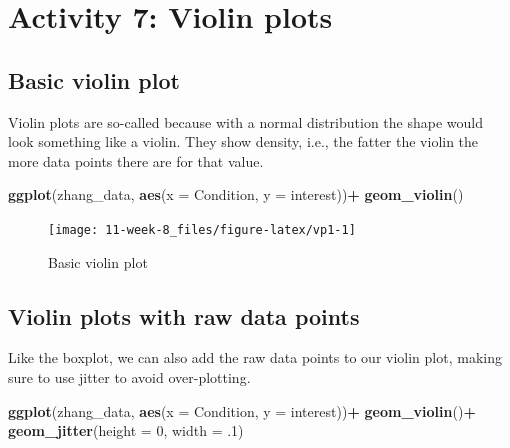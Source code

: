 \documentclass[]{book}
\newenvironment{Shaded}{\begin{snugshade}}{\end{snugshade}}
\newcommand{\DataTypeTok}[1]{\textcolor[rgb]{0.13,0.29,0.53}{#1}}
\newcommand{\DecValTok}[1]{\textcolor[rgb]{0.00,0.00,0.81}{#1}}
\newcommand{\FloatTok}[1]{\textcolor[rgb]{0.00,0.00,0.81}{#1}}
\newcommand{\KeywordTok}[1]{\textcolor[rgb]{0.13,0.29,0.53}{\textbf{#1}}}
\newcommand{\NormalTok}[1]{#1}
\newcommand{\OperatorTok}[1]{\textcolor[rgb]{0.81,0.36,0.00}{\textbf{#1}}}
\newcommand{\StringTok}[1]{\textcolor[rgb]{0.31,0.60,0.02}{#1}}
\begin{document}
\hypertarget{activity-7-violin-plots}{%
\section{Activity 7: Violin plots}\label{activity-7-violin-plots}}

\hypertarget{basic-violin-plot}{%
\subsection{Basic violin plot}\label{basic-violin-plot}}

Violin plots are so-called because with a normal distribution the shape would look something like a violin. They show density, i.e., the fatter the violin the more data points there are for that value.

\begin{Shaded}
\begin{Highlighting}[]
\KeywordTok{ggplot}\NormalTok{(zhang_data, }\KeywordTok{aes}\NormalTok{(}\DataTypeTok{x =}\NormalTok{ Condition, }\DataTypeTok{y =}\NormalTok{ interest))}\OperatorTok{+}
\StringTok{  }\KeywordTok{geom_violin}\NormalTok{()}
\end{Highlighting}
\end{Shaded}

\begin{figure}

{\centering \texttt{[image: 11-week-8\_files/figure-latex/vp1-1]} 

}

\caption{Basic violin plot}\label{fig:vp1}
\end{figure}

\hypertarget{violin-plots-with-raw-data-points}{%
\subsection{Violin plots with raw data points}\label{violin-plots-with-raw-data-points}}

Like the boxplot, we can also add the raw data points to our violin plot, making sure to use jitter to avoid over-plotting.

\begin{Shaded}
\begin{Highlighting}[]
\KeywordTok{ggplot}\NormalTok{(zhang_data, }\KeywordTok{aes}\NormalTok{(}\DataTypeTok{x =}\NormalTok{ Condition, }\DataTypeTok{y =}\NormalTok{ interest))}\OperatorTok{+}
\StringTok{  }\KeywordTok{geom_violin}\NormalTok{()}\OperatorTok{+}
\StringTok{  }\KeywordTok{geom_jitter}\NormalTok{(}\DataTypeTok{height =} \DecValTok{0}\NormalTok{, }\DataTypeTok{width =} \FloatTok{.1}\NormalTok{)}
\end{Highlighting}
\end{Shaded}
\end{document}
